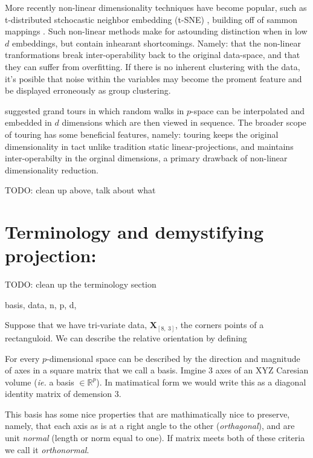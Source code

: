 \documentclass{monashthesis}
\begin{document}
More recently non-linear dimensionality techniques have become popular,
such as t-distributed stchocastic neighbor embedding (t-SNE)
\autocite{maaten_visualizing_2008}, building off of sammon mappings
\autocite{sammon_nonlinear_1969}. Such non-linear methods make for
astounding distinction when in low \(d\) embeddings, but contain
inhearant shortcomings. Namely: that the non-linear tranformations break
inter-operability back to the original data-space, and that they can
suffer from overfitting. If there is no inherent clustering with the
data, it's posible that noise within the variables may become the
proment feature and be displayed erroneously as group clustering.

\autocites{asimov_grand_1985}{buja_grand_1986} suggested grand tours in
which random walks in \(p\)-space can be interpolated and embedded in
\(d\) dimensions which are then viewed in sequence. The broader scope of
touring has some beneficial features, namely: touring keeps the original
dimensionality in tact unlike tradition static linear-projections, and
maintains inter-operabilty in the orginal dimensions, a primary drawback
of non-linear dimensionality reduction.

TODO: clean up above, talk about what

\section{Terminology and demystifying
projection:}\label{terminology-and-demystifying-projection}

TODO: clean up the terminology section

basis, data, n, p, d,

Suppose that we have tri-variate data, \(\textbf{X}_{[8,~3]}\), the
corners points of a rectanguloid. We can describe the relative
orientation by defining

For every \(p\)-dimensional space can be described by the direction and
magnitude of axes in a square matrix that we call a basis. Imgine 3 axes
of an XYZ Caresian volume (\emph{ie.} a basis \(\in \mathbb{R}^p\)). In
matimatical form we would write this as a diagonal identity matrix of
demension 3.

This basis has some nice properties that are mathimatically nice to
preserve, namely, that each axis as is at a right angle to the other
(\emph{orthagonal}), and are unit \emph{normal} (length or norm equal to
one). If matrix meets both of these criteria we call it
\emph{orthonormal}.
\end{document}
